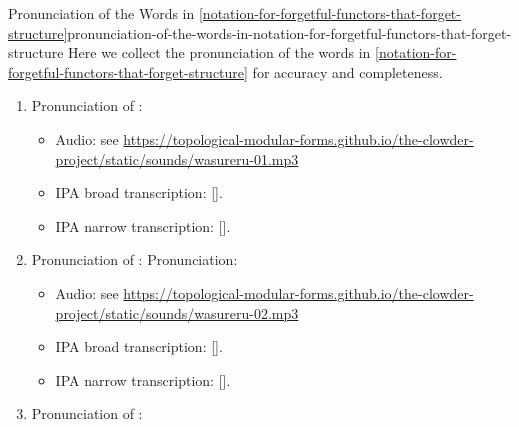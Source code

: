 \begin{remark}{Pronunciation of the Words in \cref{notation-for-forgetful-functors-that-forget-structure}}{pronunciation-of-the-words-in-notation-for-forgetful-functors-that-forget-structure}%
    Here we collect the pronunciation of the words in \cref{notation-for-forgetful-functors-that-forget-structure} for accuracy and completeness.
    \begin{enumerate}
        \item\label{pronunciation-of-the-words-in-notation-for-forgetful-functors-that-forget-structure-wasureru}Pronunciation of :
            \begin{itemize}
                    <li>Audio: <audio id="audioPlayerWasureru1" src="/static/sounds/wasureru-01.mp3" type="audio/mp3"></audio><span class="dark-svg"><button id="playButtonWasureru1"></button></span>
                \item Audio: see \url{https://topological-modular-forms.github.io/the-clowder-project/static/sounds/wasureru-01.mp3}
                \item IPA broad transcription: [].
                \item IPA narrow transcription: [].
            \end{itemize}
        \item\label{pronunciation-of-the-words-in-notation-for-forgetful-functors-that-forget-structure-boukyaku-kanshu}Pronunciation of :
            Pronunciation:
            \begin{itemize}
                    <li>Audio: <audio id="audioPlayerWasureru2" src="/static/sounds/wasureru-02.mp3" type="audio/mp3"></audio><span class="dark-svg"><button id="playButtonWasureru2"></button></span>
                \item Audio: see \url{https://topological-modular-forms.github.io/the-clowder-project/static/sounds/wasureru-02.mp3}
                \item IPA broad transcription: [].
                \item IPA narrow transcription: [].
            \end{itemize}
        \item\label{pronunciation-of-the-words-in-notation-for-forgetful-functors-that-forget-structure-wang-ji}Pronunciation of :

\end{enumerate}
\end{remark}
